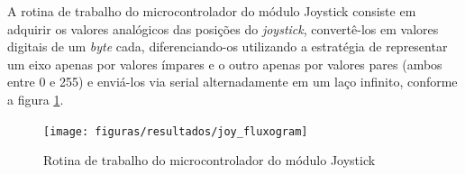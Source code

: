 A rotina de trabalho do microcontrolador do módulo Joystick consiste em adquirir os valores analógicos das posições do \textit{joystick}, convertê-los em valores digitais de um \textit{byte} cada, diferenciando-os utilizando a estratégia de representar um eixo apenas por valores ímpares e o outro apenas por valores pares (ambos entre 0 e 255) e enviá-los via serial alternadamente em um laço infinito, conforme a figura \ref{fig:joy_fluxogram}.

\begin{figure}[!htb]
\centering
\texttt{[image: figuras/resultados/joy\_fluxogram]}
\caption{Rotina de trabalho do microcontrolador do módulo Joystick}
\label{fig:joy_fluxogram}
\end{figure}

